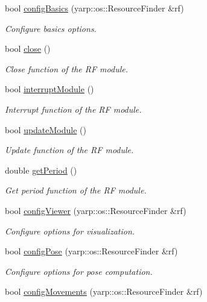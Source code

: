\begin{DoxyCompactItemize}
bool \hyperlink{classGraspingModule_a518ee4ec1b27d32c600f340c0f3bf552}{config\+Basics} (yarp\+::os\+::\+Resource\+Finder \&rf)
\begin{DoxyCompactList}\small\item\em Configure basics options. \end{DoxyCompactList}\item 
bool \hyperlink{classGraspingModule_a151b46117f2d1fdd8c321554012d63f3}{close} ()
\begin{DoxyCompactList}\small\item\em Close function of the RF module. \end{DoxyCompactList}\item 
bool \hyperlink{classGraspingModule_aca7dc9ec5e0a98b1333ed4c63650cdba}{interrupt\+Module} ()
\begin{DoxyCompactList}\small\item\em Interrupt function of the RF module. \end{DoxyCompactList}\item 
bool \hyperlink{classGraspingModule_af2cd7fa157b5d78080ffd7952655046d}{update\+Module} ()
\begin{DoxyCompactList}\small\item\em Update function of the RF module. \end{DoxyCompactList}\item 
double \hyperlink{classGraspingModule_abfc60b8437d750f2b2a48b8a617e53c1}{get\+Period} ()
\begin{DoxyCompactList}\small\item\em Get period function of the RF module. \end{DoxyCompactList}\item 
bool \hyperlink{classGraspingModule_a1086203a4db1e465ef8aba5e28f60025}{config\+Viewer} (yarp\+::os\+::\+Resource\+Finder \&rf)
\begin{DoxyCompactList}\small\item\em Configure options for visualization. \end{DoxyCompactList}\item 
bool \hyperlink{classGraspingModule_ab6d6d4c684340a0e4988a338ff72e3d0}{config\+Pose} (yarp\+::os\+::\+Resource\+Finder \&rf)
\begin{DoxyCompactList}\small\item\em Configure options for pose computation. \end{DoxyCompactList}\item 
bool \hyperlink{classGraspingModule_af83c4dc5cdc8ed18a03ce2637abda2e9}{config\+Movements} (yarp\+::os\+::\+Resource\+Finder \&rf)

\end{DoxyCompactItemize}
